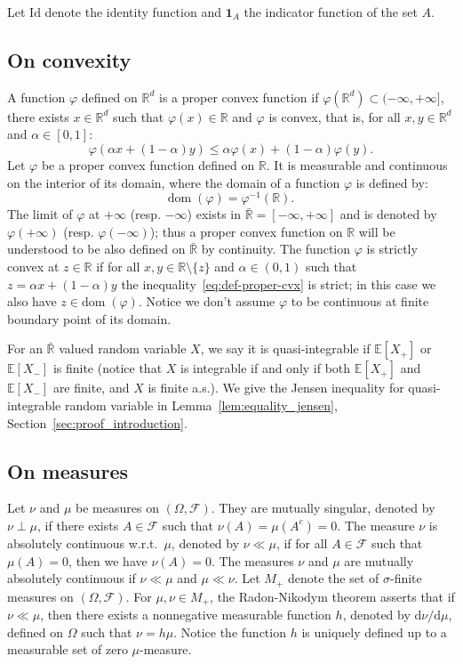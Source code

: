 \documentclass[12pt]{article}
\newcommand{\cf}{{\mathcal F}}
\newcommand{\E}{{\mathbb E}}
\newcommand{\R}{{\mathbb R}}
\newcommand{\dom}{{\mathrm{dom}}\;}
\newcommand{\id}{\mathrm{Id}}
\newcommand{\ind}{\mathbf{1}}
\newcommand{\rd}{\mathrm{d}}
\theoremstyle{plain}
\theoremstyle{remark}
\begin{document}
Let $\id$ denote the identity function and $\ind_A$ the indicator function of the set $A$.

\subsection{On convexity}
\label{sec:on_convexity}
 A  function  $\varphi$ defined  on $\R^d$  is  a proper  convex
function  if  $\varphi(\R^d)  \subset (-\infty,  +\infty]$,  there  exists
$x\in \R^d$ such that $\varphi(x)\in \R$ and $\varphi$ is convex, that is,
for all $ x,y\in \R^d$ and $ \alpha\in [0, 1]$:
\begin{equation}
  \label{eq:def-proper-cvx}
\varphi(\alpha x +  (1-\alpha) y) \leq  \alpha \varphi(x) + (1-\alpha)
\varphi (y).
\end{equation}
Let  $\varphi$ be  a  proper  convex function  defined  on  $\R$. It  is
measurable and continuous on the interior of its domain, where the domain
of a function $\varphi$ is defined by:
\[
  \dom(\varphi)=\varphi^{-1}(\R).
\]
The  limit  of  $\varphi$  at  $+\infty$  (resp.  $-\infty$)  exists  in
$\bar  \R=[-\infty ,  +\infty ]$  and is  denoted by  $\varphi(+\infty)$
(resp. $\varphi(-\infty)$); thus  a proper convex function  on $\R$ will
be  understood to  be  also  defined on  $\bar  \R$  by continuity.  The
function  $\varphi$  is  strictly  convex   at  $z\in  \R$  if  for  all
$x,y\in   \R\setminus\{z\}$   and   $\alpha   \in   (0,1)$   such   that
$z = \alpha x +  (1- \alpha) y$ the inequality~\eqref{eq:def-proper-cvx}
is strict; in this case we also have $z\in \dom(\varphi)$.
Notice we don't assume $\varphi$ to be continuous at finite boundary
point of its domain.

\medskip


For  an   $\bar  \R$  valued   random  variable   $X$,  we  say   it  is
quasi-integrable  if  $\E[X_+]$  or  $\E[X_-]$ is  finite  (notice  that
$X$ is integrable if  and only if both $\E[X_+]$ and $\E[X_-]$  are finite, and
$X$ is finite a.s.). We give the Jensen inequality for quasi-integrable
random variable in  Lemma~\ref{lem:equality_jensen}, Section~\ref{sec:proof_introduction}.



\subsection{On measures}


Let $\nu$ and $\mu$ be  measures on $(\Omega, \cf)$. They
are mutually singular, denoted by  $\nu \perp \mu$,  if there exists $A\in \cf$ such that
$\nu(A)=\mu(A^c)=0$. The measure $\nu$ is  absolutely continuous
w.r.t.\ $\mu$, denoted by $\nu\ll \mu$,
if for all $A\in \cf$ such that $\mu(A)=0$, then we have $\nu(A)=0$. The
measures $\nu$ and $\mu$ are mutually absolutely continuous if $\nu \ll
\mu$ and $\mu \ll \nu$.
Let $M_+$ denote the set of $\sigma$-finite measures on $(\Omega, \cf)$. For $\mu, \nu \in M_+$,  the Radon-Nikodym
theorem asserts that if $\nu \ll \mu$, then there exists a nonnegative
measurable function $h$, denoted by $\rd \nu / \rd \mu$, defined on
$\Omega$ such that $\nu =h \mu$.  Notice the function $h$ is uniquely  defined up
to a measurable set of zero $\mu$-measure.
\end{document}
